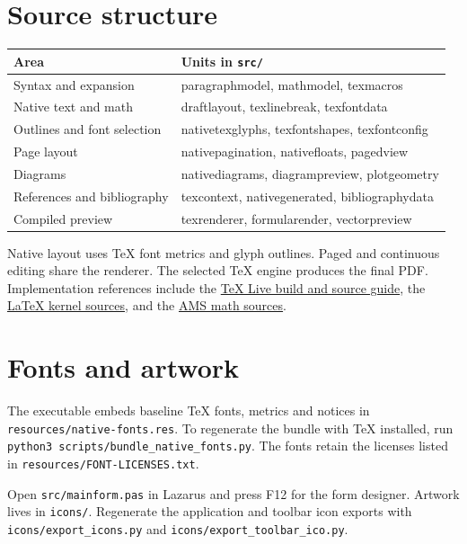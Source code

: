 \documentclass[11pt]{article}
\begin{document}
\section{Source structure}
\begin{center}\small
\begin{tabular}{ll}\toprule
Area & Units in \texttt{src/}\\\midrule
Syntax and expansion & paragraphmodel, mathmodel, texmacros\\
Native text and math & draftlayout, texlinebreak, texfontdata\\
Outlines and font selection & nativetexglyphs, texfontshapes, texfontconfig\\
Page layout & nativepagination, nativefloats, pagedview\\
Diagrams & nativediagrams, diagrampreview, plotgeometry\\
References and bibliography & texcontext, nativegenerated, bibliographydata\\
Compiled preview & texrenderer, formularender, vectorpreview\\\bottomrule
\end{tabular}
\end{center}
Native layout uses \TeX{} font metrics and glyph outlines. Paged and continuous
editing share the renderer. The selected \TeX{} engine produces the final PDF.
Implementation references include the
\href{https://tug.org/texlive/doc/tlbuild.pdf}{TeX Live build and source guide},
the \href{https://www.latex-project.org/help/documentation/source2e.pdf}{LaTeX kernel sources},
and the \href{https://ctan.org/pkg/amsmath}{AMS math sources}.

\section{Fonts and artwork}
The executable embeds baseline TeX fonts, metrics and notices in
\texttt{resources/native-fonts.res}. To regenerate the bundle with \TeX{}
installed, run \texttt{python3 scripts/bundle\_native\_fonts.py}. The fonts
retain the licenses listed in \texttt{resources/FONT-LICENSES.txt}.

Open \texttt{src/mainform.pas} in Lazarus and press F12 for the form designer.
Artwork lives in \texttt{icons/}. Regenerate the application and toolbar icon
exports with \texttt{icons/export\_icons.py} and
\texttt{icons/export\_toolbar\_ico.py}.
\end{document}
